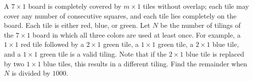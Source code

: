 A $7 \times 1$ board is completely covered by $m \times 1$ tiles without overlap; each tile may cover any number of consecutive squares, and each tile lies completely on the board.  Each tile is either red, blue, or green.  Let $N$ be the number of tilings of the $7 \times 1$ board in which all three colors are used at least once.  For example, a $1 \times 1$ red tile followed by a $2 \times 1$ green tile, a $1 \times 1$ green tile, a $2 \times 1$ blue tile, and a $1 \times 1$ green tile is a valid tiling.  Note that if the $2 \times 1$ blue tile is replaced by two $1 \times 1$ blue tiles, this results in a different tiling.  Find the remainder when $N$ is divided by $1000$.